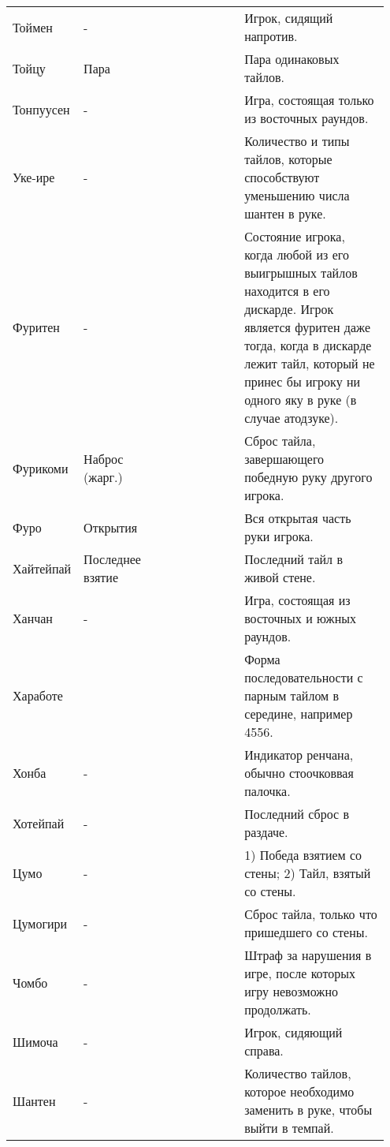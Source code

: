 \begin{tabularx}{\linewidth}{|L{0.14\linewidth}|L{0.13\linewidth}|L{0.1\linewidth}|L{0.18\linewidth}|L{0.4\linewidth}|}
	Тоймен & - &  &  & Игрок, сидящий напротив. \\
	Тойцу & Пара &  &  & Пара одинаковых тайлов. \\
	Тонпуусен & - &  &  & Игра, состоящая только из восточных раундов. \\
	Уке-ире & - &  &  & Количество и типы тайлов, которые способствуют уменьшению числа шантен в руке. \\
	Фуритен & - &  &  & Состояние игрока, когда любой из его выигрышных тайлов находится в его дискарде. Игрок является фуритен даже тогда, когда в дискарде лежит тайл, который не принес бы игроку ни одного яку в руке (в случае атодзуке). \\
	Фурикоми & Наброс (жарг.) &  &  & Сброс тайла, завершающего победную руку другого игрока. \\
	Фуро & Открытия &  &  & Вся открытая часть руки игрока. \\
	Хайтейпай & Последнее взятие &  &  & Последний тайл в живой стене. \\
	Ханчан & - &  &  & Игра, состоящая из восточных и южных раундов. \\
	Хаработе & & & & Форма последовательности с парным тайлом в середине, например 4556. \\
	Хонба & - &  &  & Индикатор ренчана, обычно стоочковвая палочка. \\
	Хотейпай & - &  &  & Последний сброс в раздаче. \\
	Цумо & - &  &  & 1) Победа взятием со стены; 2) Тайл, взятый со стены. \\
	Цумогири & - &  &  & Сброс тайла, только что пришедшего со стены. \\
	Чомбо & - &  &  & Штраф за нарушения в игре, после которых игру невозможно продолжать. \\
	Шимоча & - &  &  & Игрок, сидяющий справа. \\
	Шантен & - &  &  & Количество тайлов, которое необходимо заменить в руке, чтобы выйти в темпай. \\

\end{tabularx}
